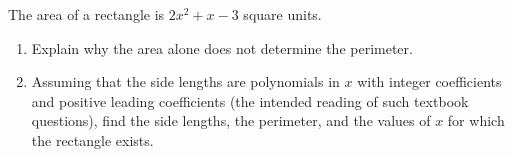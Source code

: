 The area of a rectangle is $2x^2+x-3$ square units.
\begin{enumerate}
\item[(a)] Explain why the area alone does not determine the perimeter.
\item[(b)] Assuming that the side lengths are polynomials in $x$ with integer coefficients and positive leading coefficients (the intended reading of such textbook questions), find the side lengths, the perimeter, and the values of $x$ for which the rectangle exists.
\end{enumerate}
